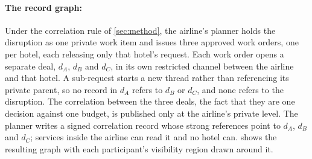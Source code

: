 \paragraph{The record graph:} Under the correlation rule of \cref{sec:method}, the airline's planner holds the disruption as one private work item and issues three approved work orders, one per hotel, each releasing only that hotel's request. Each work order opens a separate deal, $d_A$, $d_B$ and $d_C$, in its own restricted channel between the airline and that hotel. A sub-request starts a new thread rather than referencing its private parent, so no record in $d_A$ refers to $d_B$ or $d_C$, and none refers to the disruption. The correlation between the three deals, the fact that they are one decision against one budget, is published only at the airline's private level. The planner writes a signed correlation record whose strong references point to $d_A$, $d_B$ and $d_C$; services inside the airline can read it and no hotel can.  shows the resulting graph with each participant's visibility region drawn around it.

